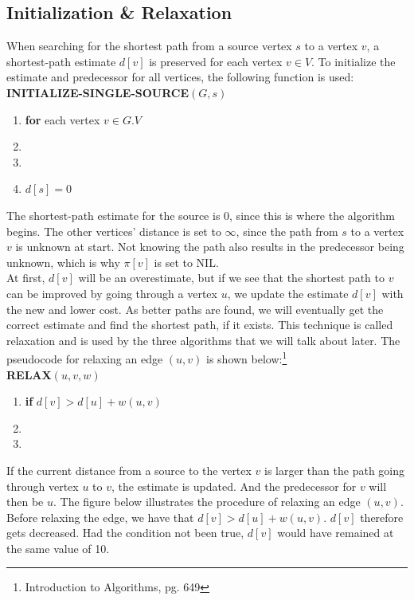 \documentclass[11pt]{article}
\begin{document}
\noindent
\subsection{Initialization \& Relaxation}
When searching for the shortest path from a source vertex $s$ to a
vertex $v$, a shortest-path estimate $d[v]$ is preserved for each
vertex $v \in V$. To initialize the estimate and predecessor for all vertices, the following function is used:\\

\textbf{INITIALIZE-SINGLE-SOURCE$(G, s)$}
\begin{enumerate}
\setlength\itemsep{0em}
\item \textbf{for } each vertex $v \in G.V$
\item {}
\item {}
\item $d[s] = 0$
\end{enumerate}
The shortest-path estimate for the source is 0, since this is where the algorithm begins. The other vertices' distance is set to $\infty$, since the path from $s$ to a vertex $v$ is unknown at start. Not knowing the path also results in the predecessor being unknown, which is why $\pi[v]$ is set to NIL.\\
At first, $d[v]$ will be an overestimate, but if we see that the shortest path to $v$ can be improved by going through a vertex $u$, we update the estimate $d[v]$ with the new and lower cost. As better paths are found, we will eventually get the correct estimate and find the shortest path, if it exists. This technique is called relaxation and is used by the three algorithms that we will talk about later. The pseudocode for relaxing an edge $(u,v) $ is shown below:\footnote{Introduction to Algorithms, pg. 649}\\

\textbf{RELAX$(u, v, w)$}
\begin{enumerate}
\setlength\itemsep{0em}
\item \textbf{if } $d[v] > d[u] + w(u,v)$
\item {}
\item {}
\end{enumerate}
If the current distance from a source to the vertex $v$ is larger than the path going through vertex $u$ to $v$, the estimate is updated. And the predecessor for $v$ will then be $u$. The figure below illustrates the procedure of relaxing an edge $(u,v)$. Before relaxing the edge, we have that $d[v] > d[u] + w(u,v)$. $d[v]$ therefore gets decreased. Had the condition not been true, $d[v]$ would have remained at the same value of 10. 
\end{document}
